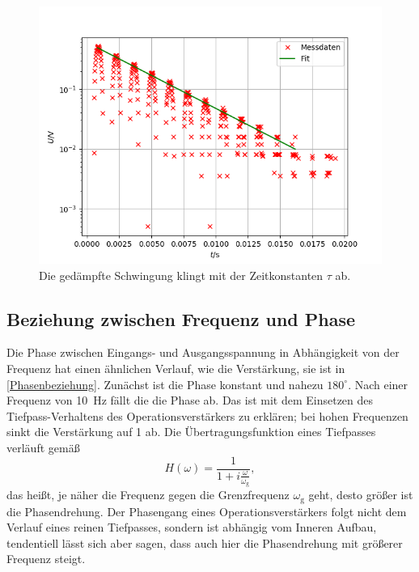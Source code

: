 \begin{figure}[h]
	\centering
	\includegraphics[width=\textwidth]{img/h.png}
	\caption{Die gedämpfte Schwingung klingt mit der Zeitkonstanten $\tau$ ab.}
	\label{h}
\end{figure}

\FloatBarrier

\subsection{Beziehung zwischen Frequenz und Phase}

Die Phase zwischen Eingangs- und Ausgangsspannung in Abhängigkeit von der Frequenz hat einen ähnlichen Verlauf, wie die Verstärkung, sie ist in \autoref{Phasenbeziehung}. Zunächst ist die Phase konstant und nahezu $180^\circ$. Nach einer Frequenz von \SI{10}{\hertz} fällt die die Phase ab. Das ist mit dem Einsetzen des Tiefpass-Verhaltens des Operationsverstärkers zu erklären; bei hohen Frequenzen sinkt die Verstärkung auf 1 ab. Die Übertragungsfunktion eines Tiefpasses verläuft gemäß
\begin{equation}
	H(\omega) = \frac{1}{1 + i\frac{\omega}{\omega_\text{g}}},
\end{equation}
das heißt, je näher die Frequenz gegen die Grenzfrequenz $\omega_\text{g}$ geht, desto größer ist die Phasendrehung. Der Phasengang eines Operationsverstärkers folgt nicht dem Verlauf eines reinen Tiefpasses, sondern ist abhängig vom Inneren Aufbau, tendentiell lässt sich aber sagen, dass auch hier die Phasendrehung mit größerer Frequenz steigt.

